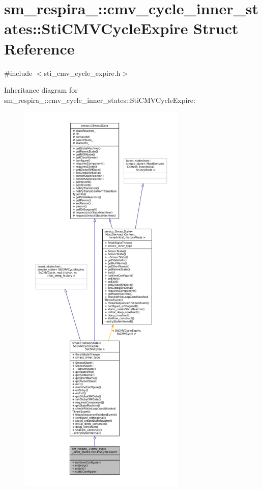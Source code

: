 \hypertarget{structsm__respira__1_1_1cmv__cycle__inner__states_1_1StiCMVCycleExpire}{}\section{sm\+\_\+respira\+\_\+:\+:cmv\+\_\+cycle\+\_\+inner\+\_\+states\+:\+:Sti\+C\+M\+V\+Cycle\+Expire Struct Reference}
\label{structsm__respira__1_1_1cmv__cycle__inner__states_1_1StiCMVCycleExpire}


{\ttfamily \#include $<$sti\+\_\+cmv\+\_\+cycle\+\_\+expire.\+h$>$}



Inheritance diagram for sm\+\_\+respira\+\_\+:\+:cmv\+\_\+cycle\+\_\+inner\+\_\+states\+:\+:Sti\+C\+M\+V\+Cycle\+Expire\+:
\nopagebreak
\begin{figure}[H]
\begin{center}
\leavevmode
\includegraphics[height=550pt]{structsm__respira__1_1_1cmv__cycle__inner__states_1_1StiCMVCycleExpire__inherit__graph}
\end{center}
\end{figure}


